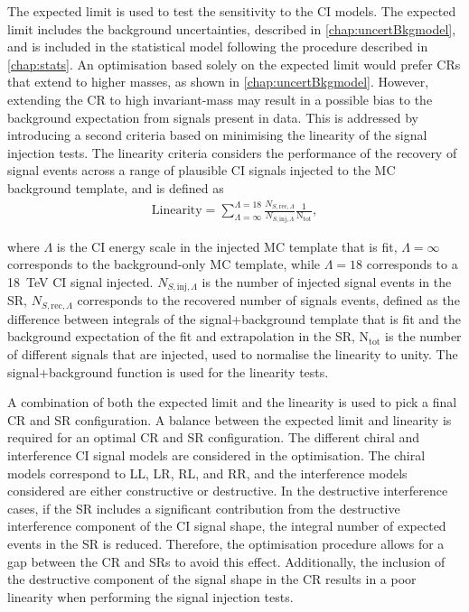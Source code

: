 The expected limit is used to test the sensitivity to the CI models. The expected limit includes the background uncertainties, described in \cref{chap:uncertBkgmodel}, and is included in the statistical model following the procedure described in \cref{chap:stats}. An optimisation based solely on the expected limit would prefer CRs that extend to higher masses, as shown in \cref{chap:uncertBkgmodel}. However, extending the CR to high invariant-mass may result in a possible bias to the background expectation from signals present in data. This is addressed by introducing a second criteria based on minimising the linearity of the signal injection tests. The linearity criteria considers the performance of the recovery of signal events across a range of plausible CI signals injected to the MC background template, and is defined as
\begin{equation}
    \label{eq:linearity}
    \begin{aligned}
        \mathrm{Linearity} = \sum^{\Lambda = 18}_{\Lambda = \infty} \frac{N_{S,\mathrm{rec},\Lambda}}{N_{S,\mathrm{inj},\Lambda}}  \frac{1}{\mathrm{N}_\mathrm{tot}},
    \end{aligned}
\end{equation}

where $\Lambda$ is the CI energy scale in the injected MC template that is fit, $\Lambda = \infty$ corresponds to the background-only MC template, while $\Lambda = 18$ corresponds to a \SI{18}{\tera\electronvolt} CI signal injected. $N_{S,\mathrm{inj},\Lambda}$ is the number of injected signal events in the SR, $N_{S,\mathrm{rec},\Lambda}$ corresponds to the recovered number of signals events, defined as the difference between integrals of the signal+background template that is fit and the background expectation of the fit and extrapolation in the SR, $\mathrm{N}_\mathrm{tot}$ is the number of different signals that are injected, used to normalise the linearity to unity. The signal+background function is used for the linearity tests. 

A combination of both the expected limit and the linearity is used to pick a final CR and SR configuration. A balance between the expected limit and linearity is required for an optimal CR and SR configuration. The different chiral and interference CI signal models are considered in the optimisation. The chiral models correspond to LL, LR, RL, and RR, and the interference models considered are either constructive or destructive. In the destructive interference cases, if the SR includes a significant contribution from the destructive interference component of the CI signal shape, the integral number of expected events in the SR is reduced. Therefore, the optimisation procedure allows for a gap between the CR and SRs to avoid this effect. Additionally, the inclusion of the destructive component of the signal shape in the CR results in a poor linearity when performing the signal injection tests. 

